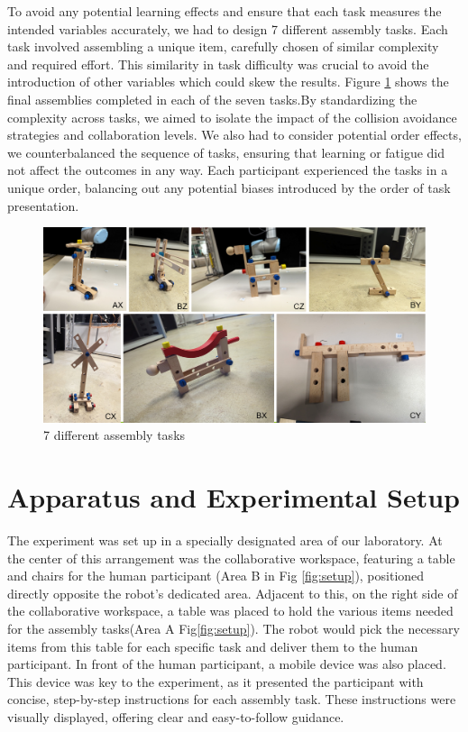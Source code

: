 To avoid any potential learning effects and ensure that each task measures the intended variables accurately, we had to design 7 different assembly tasks. Each task involved assembling a unique item, carefully chosen of similar complexity and required effort. This similarity in task difficulty was crucial to avoid the introduction of other variables which could skew the results. Figure \ref{fig:task} shows the final assemblies completed in each of the seven tasks.By standardizing the complexity across tasks, we aimed to isolate the impact of the collision avoidance strategies and collaboration levels. We also had to consider potential order effects, we counterbalanced the sequence of tasks, ensuring that learning or fatigue did not affect the outcomes in any way. Each participant experienced the tasks in a unique order, balancing out any potential biases introduced by the order of task presentation. 

\begin{figure}[h]
	\centering
	\includegraphics[width=\columnwidth]{images/7tasks.png}
	\caption{7 different assembly tasks}
	\label{fig:task}
\end{figure}

\section{Apparatus and Experimental Setup} 
The experiment was set up in a specially designated area of our laboratory. At the center of this arrangement was the collaborative workspace, featuring a table and chairs for the human participant (Area B in Fig \ref{fig:setup}), positioned directly opposite the robot's dedicated area. Adjacent to this, on the right side of the collaborative workspace, a table was placed to hold the various items needed for the assembly tasks(Area A Fig\ref{fig:setup}). The robot would pick the necessary items from this table for each specific task and deliver them to the human participant. In front of the human participant, a mobile device was also placed. This device was key to the experiment, as it presented the participant with concise, step-by-step instructions for each assembly task. These instructions were visually displayed, offering clear and easy-to-follow guidance. 

